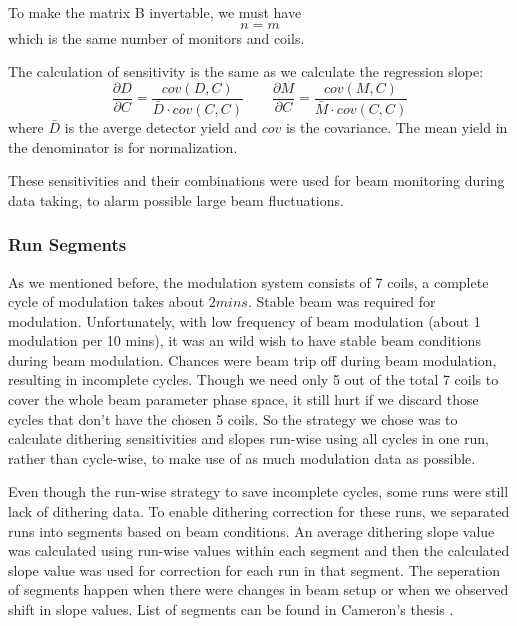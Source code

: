 To make the matrix B invertable, we must have
\begin{equation}
    n = m
\end{equation}
which is the same number of monitors and coils.

The calculation of sensitivity is the same as we calculate the regression slope:
\begin{equation}
    \frac{\partial D}{\partial C} = \frac{cov(D, C)}{\bar{D} \cdot cov(C, C)}
    \qquad
    \frac{\partial M}{\partial C} = \frac{cov(M, C)}{\bar{M} \cdot cov(C, C)}
\end{equation}
where $\bar{D}$ is the averge detector yield and $cov$ is the covariance. The
mean yield in the denominator is for normalization. 

These sensitivities and their combinations were used for beam monitoring during
data taking, to alarm possible large beam fluctuations.

\subsubsection{Run Segments}
As we mentioned before, the modulation system consists of 7 coils, a complete 
cycle of modulation takes about $2 mins$. Stable beam was required for modulation.
Unfortunately, with low frequency of beam modulation (about 1 modulation per 10 mins), 
it was an wild wish to have stable beam conditions during beam modulation. Chances were
beam trip off during beam modulation, resulting in incomplete cycles. Though we
need only 5 out of the total 7 coils to cover the whole beam parameter phase space,
it still hurt if we discard those cycles that don't have the chosen 5 coils. So
the strategy we chose was to calculate dithering sensitivities and slopes run-wise
using all cycles in one run, rather than cycle-wise, to make use of 
as much modulation data as possible.

Even though the run-wise strategy to save incomplete cycles, some runs were still
lack of dithering data. To enable dithering correction for these runs, we separated
runs into segments based on beam conditions. An average dithering slope value
was calculated using run-wise values within each segment and then the calculated
slope value was used for correction for each run in that segment. The seperation
of segments happen when there were changes in beam setup or when we observed shift
in slope values. List of segments can be found in Cameron's thesis \cite{Cameron_thesis}.

